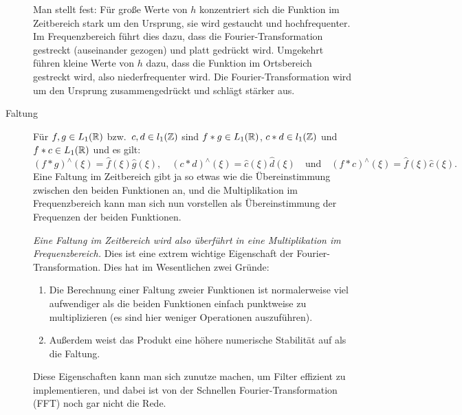 \begin{remark}
\begin{description}
    Man stellt fest: Für große Werte von $ h $ konzentriert sich die Funktion im Zeitbereich stark 
    um den Ursprung, sie wird gestaucht und hochfrequenter. Im Frequenzbereich führt dies dazu,
    dass die Fourier-Transformation gestreckt (auseinander gezogen) und platt gedrückt wird.
    Umgekehrt führen kleine Werte von $ h $ dazu, dass die Funktion im Ortsbereich gestreckt wird,
    also niederfrequenter wird. Die Fourier-Transformation wird um den Ursprung zusammengedrückt und
    schlägt stärker aus.
    
		\item [Faltung] Für $ f, g \in L_{1}(\mathbb{R}) $ bzw.\ $ c, d \in l_{1}(\mathbb{Z}) $ sind 
  	$ f * g \in L_{1}(\mathbb{R}) $, $ c * d \in l_{1}(\mathbb{Z}) $ und $ f * c \in L_{1}(\mathbb{R}) $ und es gilt:
    \[
      (f * g)^{\wedge}(\xi) = \widehat{f}(\xi) \widehat{g}(\xi), \quad
      (c * d)^{\wedge}(\xi) = \widehat{c}(\xi) \widehat{d}(\xi)  \quad \text{und} \quad
      (f * c)^{\wedge}(\xi) = \widehat{f}(\xi) \widehat{c}(\xi).
    \]
    Eine Faltung im Zeitbereich gibt ja so etwas wie die Übereinstimmung zwischen den beiden 
    Funktionen an, und die Multiplikation im Frequenzbereich kann man sich nun vorstellen als
    Übereinstimmung der Frequenzen der beiden Funktionen.
    
    \emph{Eine Faltung im Zeitbereich wird also überführt in eine Multiplikation im   
    Frequenzbereich.} Dies ist eine extrem wichtige Eigenschaft der Fourier-Transformation. Dies hat
    im Wesentlichen zwei Gründe:
    \begin{enumerate}
    \item Die Berechnung einer Faltung zweier Funktionen ist normalerweise viel aufwendiger als die 
        beiden Funktionen einfach punktweise zu multiplizieren (es sind hier weniger Operationen
        auszuführen).
    \item Außerdem weist das Produkt eine höhere numerische Stabilität auf als die Faltung.
    \end{enumerate}
    Diese Eigenschaften kann man sich zunutze machen, um Filter effizient zu implementieren, und
    dabei ist von der Schnellen Fourier-Transformation (FFT) noch gar nicht die Rede.
    

\end{description}
\end{remark}
